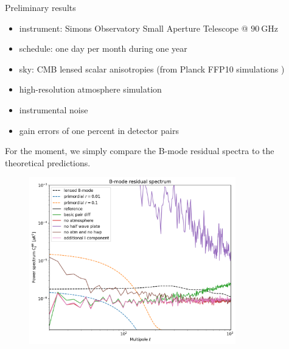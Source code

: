 \documentclass[final]{beamer}
\newlength{\colwidth}
\begin{document}
\begin{frame}[t]
\begin{columns}[t]
\begin{column}{\colwidth}
\begin{block}{Preliminary results}
        \begin{itemize}
          \item instrument: Simons Observatory Small Aperture Telescope @ $\qty[mode=text]{90}{\giga\hertz}$
          \item schedule: one day per month during one year
          \item sky: CMB lensed scalar anisotropies (from Planck FFP10 simulations \cite{Planck:2018-iii})
          \item high-resolution atmosphere simulation
          \item instrumental noise
          \item gain errors of one percent in detector pairs
        \end{itemize}

        For the moment, we simply compare the B-mode residual spectra to the theoretical predictions.

        \begin{figure}
          \centering
          \includegraphics[width=0.8\textwidth]{figures/comparison.png}
        \end{figure}


\end{block}
\end{column}
\end{columns}
\end{frame}
\end{document}
